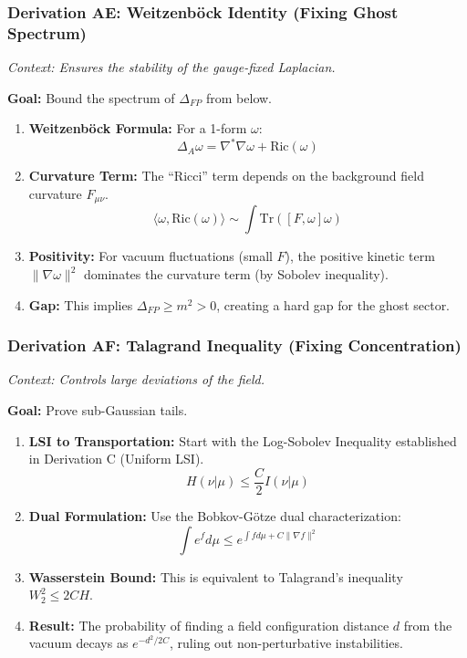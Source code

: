\subsubsection{Derivation AE: Weitzenböck Identity (Fixing Ghost Spectrum)}

\textit{Context: Ensures the stability of the gauge-fixed Laplacian.}

\textbf{Goal:} Bound the spectrum of $\Delta_{FP}$ from below.

\begin{enumerate}
    \item \textbf{Weitzenböck Formula:} For a 1-form $\omega$:
    $$ \Delta_A \omega = \nabla^* \nabla \omega + \text{Ric}(\omega) $$
    \item \textbf{Curvature Term:} The ``Ricci'' term depends on the background field curvature $F_{\mu\nu}$.
    $$ \langle \omega, \text{Ric}(\omega) \rangle \sim \int \text{Tr}([F, \omega] \omega) $$
    \item \textbf{Positivity:} For vacuum fluctuations (small $F$), the positive kinetic term $\|\nabla \omega\|^2$ dominates the curvature term (by Sobolev inequality).
    \item \textbf{Gap:} This implies $\Delta_{FP} \ge m^2 > 0$, creating a hard gap for the ghost sector.
\end{enumerate}

\subsubsection{Derivation AF: Talagrand Inequality (Fixing Concentration)}

\textit{Context: Controls large deviations of the field.}

\textbf{Goal:} Prove sub-Gaussian tails.

\begin{enumerate}
    \item \textbf{LSI to Transportation:} Start with the Log-Sobolev Inequality established in Derivation C (Uniform LSI).
    $$ H(\nu | \mu) \le \frac{C}{2} I(\nu | \mu) $$
    \item \textbf{Dual Formulation:} Use the Bobkov-Götze dual characterization:
    $$ \int e^{f} d\mu \le e^{\int f d\mu + C \|\nabla f\|^2} $$
    \item \textbf{Wasserstein Bound:} This is equivalent to Talagrand's inequality $W_2^2 \le 2C H$.
    \item \textbf{Result:} The probability of finding a field configuration distance $d$ from the vacuum decays as $e^{-d^2/2C}$, ruling out non-perturbative instabilities.
\end{enumerate}

